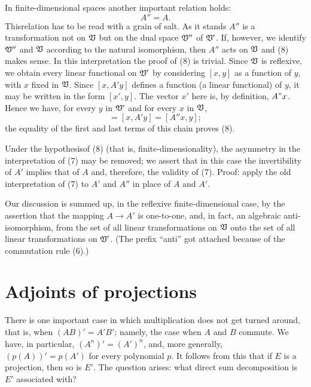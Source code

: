 In finite-dimensional spaces another important relation holds:
\begin{equation}
    A'' = A.
\end{equation}
Thisrelation has to be read with a grain of salt. As it stands \(A''\) is a
transformation not on \(\mathfrak{V}\) but on the dual space \(\mathfrak{V}''\) of \(\mathfrak{V}'\).
If, however, we identify \(\mathfrak{V}''\) and \(\mathfrak{V}\) according to the natural
isomorphism, then \(A''\) acts on \(\mathfrak{V}\) and (8) makes sense. In this
interpretation the proof of (8) is trivial. Since \(\mathfrak{V}\) is reflexive, we
obtain every linear functional on \(\mathfrak{V}'\) by considering \([x, y]\) as a
function of \(y\), with \(x\) fixed in \(\mathfrak{V}\). Since \([x, A'y]\) defines a
function (a linear functional) of \(y\), it may be written in the form \([x',
y]\). The vector \(x'\) here is, by definition, \(A"x\). Hence we have, for
every \(y\) in \(\mathfrak{V}'\) and for every \(x\) in \(\mathfrak{V}\),
\begin{equation*}
    [Ax, y] = [x, A'y] = [A''x, y];
\end{equation*}
the equality of the first and last terms of this chain proves (8).

Under the hypothesisof (8) (that is, finite-dimensionality), the asymmetry in
the interpretation of (7) may be removed; we assert that in this case the
invertibility of \(A'\) implies that of \(A\) and, therefore, the validity of
(7). Proof: apply the old interpretation of (7) to \(A'\) and \(A''\) in place
of \(A\) and \(A'\).

Our discussion is summed up, in the reflexive finite-dimensional case, by the
assertion that the mapping \(A \to A'\) is one-to-one, and, in fact, an
algebraic anti-isomorphism, from the set of all linear transformations on
\(\mathfrak{V}\) onto the set of all linear transformations on \(\mathfrak{V}'\). (The
prefix ``anti'' got attached because of the commutation rule (6).)

\section{Adjoints of projections}

There is one important case in which multiplication does not get turned around,
that is, when \((AB)' = A'B'\); namely, the case when \(A\) and \(B\) commute.
We have, in particular, \((A^n)' = (A')^n\), and, more generally, \((p(A))' =
p(A')\) for every polynomial \(p\). It follows from this that if \(E\) is a
projection, then so is \(E'\). The question arises: what direct sum
decomposition is \(E'\) associated with?

